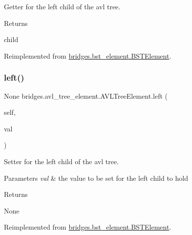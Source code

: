 Getter for the left child of the avl tree. 

\begin{DoxyReturn}{Returns}


child 
\end{DoxyReturn}


Reimplemented from \mbox{\hyperlink{classbridges_1_1bst__element_1_1_b_s_t_element_adb40ae0f98fe1cb7f153494c544d3f9f}{bridges.\+bst\+\_\+element.\+B\+S\+T\+Element}}.

\mbox{\label{classbridges_1_1avl__tree__element_1_1_a_v_l_tree_element_a5ee29c8a42e07019a77ecd7a2534f8be}} 
\subsubsection{\texorpdfstring{left()}{left()}\hspace{0.1cm}{\footnotesize\ttfamily [2/2]}}
{\footnotesize\ttfamily  None bridges.\+avl\+\_\+tree\+\_\+element.\+A\+V\+L\+Tree\+Element.\+left (\begin{DoxyParamCaption}\item[{}]{self,  }\item[{}]{val }\end{DoxyParamCaption})}



Setter for the left child of the avl tree. 


\begin{DoxyParams}{Parameters}
{\em val} & the value to be set for the left child to hold \\
\hline
\end{DoxyParams}
\begin{DoxyReturn}{Returns}


None 
\end{DoxyReturn}


Reimplemented from \mbox{\hyperlink{classbridges_1_1bst__element_1_1_b_s_t_element_a0b45e63b73faabb6b969dd6222e07942}{bridges.\+bst\+\_\+element.\+B\+S\+T\+Element}}.

\mbox{\label{classbridges_1_1avl__tree__element_1_1_a_v_l_tree_element_aaab3b79617e7e503b1a7c28069d1eb15}} 
